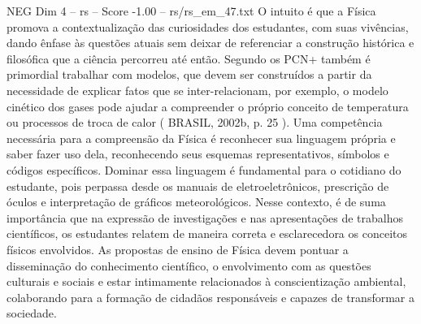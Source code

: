 \begin{textsample}{NEG Dim 4 – rs – Score -1.00 – rs/rs\_em\_47.txt}
O intuito é que a Física promova a contextualização das curiosidades dos estudantes, com suas vivências, dando ênfase às questões atuais sem deixar de referenciar a construção histórica e filosófica que a ciência percorreu até então.
Segundo os PCN+ também é primordial trabalhar com modelos, que devem ser construídos a partir da necessidade de explicar fatos que se inter-relacionam, por exemplo, o modelo cinético dos gases pode ajudar a compreender o próprio conceito de temperatura ou processos de troca de calor ( BRASIL, 2002b, p. 25 ).
Uma competência necessária para a compreensão da Física é reconhecer sua linguagem própria e saber fazer uso dela, reconhecendo seus esquemas representativos, símbolos e códigos específicos.
Dominar essa linguagem é fundamental para o cotidiano do estudante, pois perpassa desde os manuais de eletroeletrônicos, prescrição de óculos e interpretação de gráficos meteorológicos.
Nesse contexto, é de suma importância que na expressão de investigações e nas apresentações de trabalhos científicos, os estudantes relatem de maneira correta e esclarecedora os conceitos físicos envolvidos.
As propostas de ensino de Física devem pontuar a disseminação do conhecimento científico, o envolvimento com as questões culturais e sociais e estar intimamente relacionados à conscientização ambiental, colaborando para a formação de cidadãos responsáveis e capazes de transformar a sociedade.

\end{textsample}
